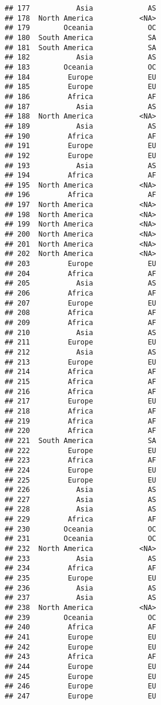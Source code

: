 \documentclass[
]{article}
\begin{document}
\begin{verbatim}
## 177           Asia             AS
## 178  North America           <NA>
## 179        Oceania             OC
## 180  South America             SA
## 181  South America             SA
## 182           Asia             AS
## 183        Oceania             OC
## 184         Europe             EU
## 185         Europe             EU
## 186         Africa             AF
## 187           Asia             AS
## 188  North America           <NA>
## 189           Asia             AS
## 190         Africa             AF
## 191         Europe             EU
## 192         Europe             EU
## 193           Asia             AS
## 194         Africa             AF
## 195  North America           <NA>
## 196         Africa             AF
## 197  North America           <NA>
## 198  North America           <NA>
## 199  North America           <NA>
## 200  North America           <NA>
## 201  North America           <NA>
## 202  North America           <NA>
## 203         Europe             EU
## 204         Africa             AF
## 205           Asia             AS
## 206         Africa             AF
## 207         Europe             EU
## 208         Africa             AF
## 209         Africa             AF
## 210           Asia             AS
## 211         Europe             EU
## 212           Asia             AS
## 213         Europe             EU
## 214         Africa             AF
## 215         Africa             AF
## 216         Africa             AF
## 217         Europe             EU
## 218         Africa             AF
## 219         Africa             AF
## 220         Africa             AF
## 221  South America             SA
## 222         Europe             EU
## 223         Africa             AF
## 224         Europe             EU
## 225         Europe             EU
## 226           Asia             AS
## 227           Asia             AS
## 228           Asia             AS
## 229         Africa             AF
## 230        Oceania             OC
## 231        Oceania             OC
## 232  North America           <NA>
## 233           Asia             AS
## 234         Africa             AF
## 235         Europe             EU
## 236           Asia             AS
## 237           Asia             AS
## 238  North America           <NA>
## 239        Oceania             OC
## 240         Africa             AF
## 241         Europe             EU
## 242         Europe             EU
## 243         Africa             AF
## 244         Europe             EU
## 245         Europe             EU
## 246         Europe             EU
## 247         Europe             EU

\end{verbatim}
\end{document}
